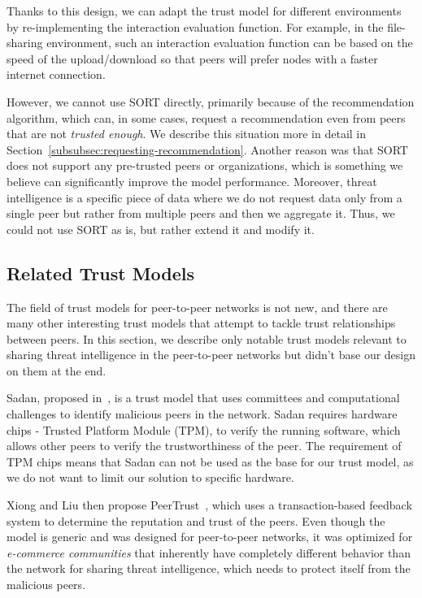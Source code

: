 Thanks to this design, we can adapt the trust model for different environments by re-implementing the interaction evaluation function.
For example, in the file-sharing environment, such an interaction evaluation function can be based on the speed of the upload/download so that peers will prefer nodes with a faster internet connection.

However, we cannot use SORT directly, primarily because of the recommendation algorithm, which can, in some cases, request a recommendation even from peers that are not \textit{trusted enough}. We describe this situation more in detail in Section~\ref{subsubsec:requesting-recommendation}.
Another reason was that SORT does not support any pre-trusted peers or organizations, which is something we believe can significantly improve the model performance.
Moreover, threat intelligence is a specific piece of data where we do not request data only from a single peer but rather from multiple peers and then we aggregate it.
Thus, we could not use SORT as is, but rather extend it and modify it.

\subsection{Related Trust Models}
\label{subsec:related-trust-models}
The field of trust models for peer-to-peer networks is not new, and there are many other interesting trust models that attempt to tackle trust relationships between peers.
In this section, we describe only notable trust models relevant to sharing threat intelligence in the peer-to-peer networks but didn't base our design on them at the end.

Sadan, proposed in~\cite{abera2019sadan}, is a trust model that uses committees and computational challenges to identify malicious peers in the network.
Sadan requires hardware chips - Trusted Platform Module (TPM), to verify the running software, which allows other peers to verify the trustworthiness of the peer.
The requirement of TPM chips means that Sadan can not be used as the base for our trust model, as we do not want to limit our solution to specific hardware.

Xiong and Liu then propose PeerTrust~\cite{xiong2004peertrust}, which uses a transaction-based feedback system to determine the reputation and trust of the peers.
Even though the model is generic and was designed for peer-to-peer networks, it was optimized for \textit{e-commerce communities} that inherently have completely different behavior than the network for sharing threat intelligence, which needs to protect itself from the malicious peers.

